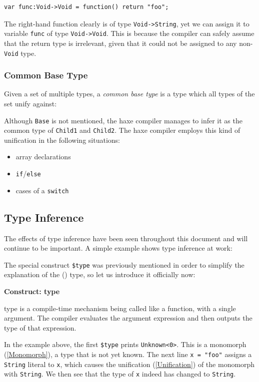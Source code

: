 \documentclass{article}
\newcommand{\type}[1]{\texttt{#1}}
\newcommand{\expr}[1]{\texttt{#1}}
\newenvironment{myshaded}
  {\def\FrameCommand{\fboxsep=\topsep\colorbox{bgcolor}}%
  \MakeFramed {\advance\hsize-\width \FrameRestore}}%
 {\endMakeFramed}
\newcommand{\define}[3][Definition]
	{\begin{myshaded}\noindent\textbf{#1: #2}\par\nobreak\noindent\ignorespaces#3\label{def:#2}\end{myshaded}}
\newcommand{\Fullref}[1]{\nameref{#1} (\Cref{#1})}
\newcommand{\tref}[2]{#1 (\ref{#2})}
\newcommand{\haxe}[2][]{%
}
\begin{document}
\begin{lstlisting}
var func:Void->Void = function() return "foo";
\end{lstlisting}
The right-hand function clearly is of type \type{Void->String}, yet we can assign it to variable \expr{func} of type \type{Void->Void}. This is because the compiler can safely assume that the return type is irrelevant, given that it could not be assigned to any non-\type{Void} type.


\subsubsection{Common Base Type}
\label{Common Base Type}

Given a set of multiple types, a \emph{common base type} is a type which all types of the set unify against:

\haxe{assets/UnifyMin.hx}
Although \type{Base} is not mentioned, the haxe compiler manages to infer it as the common type of \type{Child1} and \type{Child2}. The haxe compiler employs this kind of unification in the following situations:

\begin{itemize}
	\item array declarations
	\item \expr{if}/\expr{else}
	\item cases of a \expr{switch}
\end{itemize}




\subsection{Type Inference}
\label{Type Inference}

The effects of type inference have been seen throughout this document and will continue to be important. A simple example shows type inference at work:

\haxe{assets/TypeInference.hx}
The special construct \expr{\$type} was previously mentioned in order to simplify the explanation of the \Fullref{Function} type, so let us introduce it officially now:

\define[Construct]{type}{type is a compile-time mechanism being called like a function, with a single argument. The compiler evaluates the argument expression and then outputs the type of that expression.}

In the example above, the first \expr{\$type} prints \expr{Unknown<0>}. This is a \tref{monomorph}{Monomorph}, a type that is not yet known. The next line \expr{x = "foo"} assigns a \type{String} literal to \expr{x}, which causes the \tref{unification}{Unification} of the monomorph with \type{String}. We then see that the type of \expr{x} indeed has changed to \type{String}.
\end{document}
